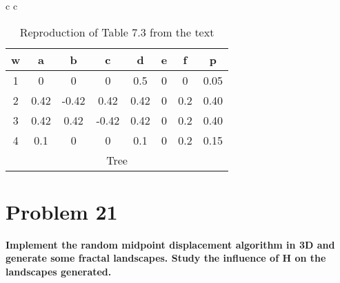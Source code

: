 \begin{table}
\begin{tabular}{ c c }
	\begin{tabular}{ c c c c c c c c }
	\hline
	w & a & b & c & d & e & f & p \\
	\hline
	1 & 0 & 0 & 0 & 0.5 & 0 & 0 & 0.05 \\
	2 & 0.42 & -0.42 & 0.42 & 0.42 & 0 & 0.2 & 0.40 \\
	3 & 0.42 & 0.42 & -0.42 & 0.42 & 0 & 0.2 & 0.40 \\
	4 & 0.1 & 0 & 0 & 0.1 & 0 & 0.2 & 0.15 \\
	\hline
	\multicolumn{8}{c}{Tree}
	\end{tabular}
\end{tabular}
\caption{Reproduction of Table 7.3 from the text}
\label{7.3_rep}
\end{table}

\section{Problem 21}
\textbf{
Implement the random midpoint displacement algorithm in 3D and generate some fractal landscapes. Study the influence of H on the landscapes generated.
}

\hfill \\
